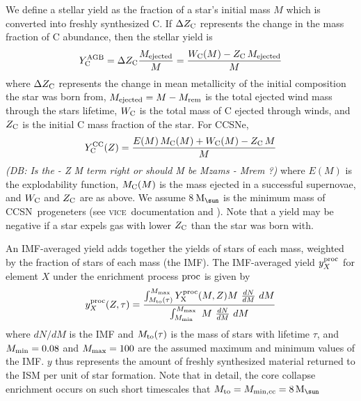 \documentclass[fleqn,
usenatbib]{mnras}
\newcommand{\VICE}{\textsc{vice}}
\newcommand{\cc}{CCSN}
\newcommand{\y}{Y}
\newcommand{\Mo}{ {\rm M}_{\sun}}
\newcommand{\dbnote}[1]{ {\color{Thistle} \textit{\small (DB: #1)}} }
\begin{document}
We define a stellar yield as the fraction of a star's initial mass $M$ which is converted into freshly synthesized C. If $\Delta Z_{\rm C}$ represents the change in the mass fraction of C abundance, then the stellar yield is
\begin{equation}
    \y_{\rm C}^{\rm AGB} =  \Delta Z_{\rm C} \frac{M_{\rm ejected}}{M} = 
    \frac{W_{\rm C}(M) - Z_{\rm C}\, M_{\rm ejected}}{M}
\end{equation}
where $\Delta Z_{\rm C}$ represents the change in mean metallicity of the initial composition the star was born from, $M_{\rm ejected} = M - M_{\rm rem}$ is the total ejected wind mass through the stars lifetime, $W_{\rm C}$ is the total mass of C ejected through winds, and $Z_{\rm C}$ is the initial C mass fraction of the star. 
For CCSNe, 
\begin{equation} \label{eq:imf-cc-yield}
   Y_{\rm C}^{\rm CC}(Z) = 
    \frac{E(M)\,M_{\rm C}(M) + W_{\rm C}(M) - Z_{\rm C}\,M}{M}
\end{equation}
\dbnote{Is the - Z M term right or should M be Mzams - Mrem ?}
where $E(M)$ is the explodability function, $M_{\rm C}(M)$ is the mass ejected in a successful supernovae, and $W_{\rm C}$ and $Z_{\rm C}$ are as above.
We assume 8\,$\Mo$ is the minimum mass of \cc\ progeneters (see \VICE\ documentation and \citealt{emily+21}). 
Note that a yield may be negative if a star expels gas with lower $Z_{\rm C}$ than the star was born with. 



An IMF-averaged yield adds together the yields of stars of each mass, weighted by the fraction of stars of each mass (the IMF). 
The IMF-averaged yield $y_X^{\rm proc}$ for element $X$ under the enrichment process ${\rm proc}$ is given by
\begin{equation} \label{eq:imf-agb-yield}
    y_{X}^{\rm proc}(Z,\tau) = 
    \frac{
    \int_{M_{\rm to}(\tau)}^{M_{\rm max}} 
    \y_{\rm X}^{\rm proc}(M, Z) M\ 
    \frac{dN}{dM}\ dM
}
{
    \int_{M_{\rm min}}^{M_{\rm max}}\ M\ \frac{dN}{dM}\ dM
}
\end{equation}
where ${dN}/{dM}$ is the IMF and $M_{\rm to}(\tau)$ is the mass of stars with lifetime $\tau$, and $M_{\rm min}=0.08$ and $M_{\rm max} = 100$ are the assumed maximum and minimum values of the IMF.
$y$ thus represents the amount of freshly synthesized material returned to the ISM per unit of star formation. 
Note that in detail, the core collapse enrichment occurs on such short timescales that $M_{\rm to} = M_{\rm min, cc} = 8\,\Mo$
\end{document}
